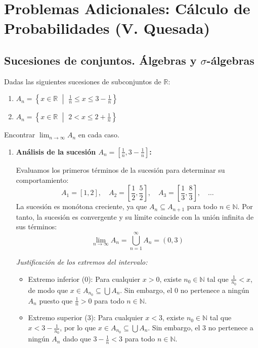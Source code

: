 \chapter{Problemas Adicionales: Cálculo de Probabilidades (V. Quesada)}

\section{Sucesiones de conjuntos. Álgebras y \texorpdfstring{$\sigma$}{sigma}-álgebras}

\begin{problema}
Dadas las siguientes sucesiones de subconjuntos de $\mathbb{R}$:
\begin{enumerate}[label=\alph*)]
    \item $A_n = \left\{ x \in \mathbb{R} \,\,\middle|\,\, \frac{1}{n} \le x \le 3 - \frac{1}{n} \right\}$
    \item $A_n = \left\{ x \in \mathbb{R} \,\,\middle|\,\, 2 < x \le 2 + \frac{1}{n} \right\}$
\end{enumerate}
Encontrar $\displaystyle \lim_{n \to \infty} A_n$ en cada caso.

\tcblower

\begin{enumerate}[label=\alph*)]
    \item \textbf{Análisis de la sucesión $A_n = \left[\frac{1}{n}, 3 - \frac{1}{n}\right]$:}
    
    Evaluamos los primeros términos de la sucesión para determinar su comportamiento:
    \[
        A_1 = [1, 2], \quad A_2 = \left[\frac{1}{2}, \frac{5}{2}\right], \quad A_3 = \left[\frac{1}{3}, \frac{8}{3}\right], \quad \dots
    \]
    La sucesión es monótona creciente, ya que $A_n \subseteq A_{n+1}$ para todo $n \in \mathbb{N}$. Por tanto, la sucesión es convergente y su límite coincide con la unión infinita de sus términos:
    \[
        \lim_{n \to \infty} A_n = \bigcup_{n=1}^\infty A_n = (0, 3)
    \]
    
    \textit{Justificación de los extremos del intervalo:}
    \begin{itemize}
        \item Extremo inferior ($0$): Para cualquier $x > 0$, existe $n_0 \in \mathbb{N}$ tal que $\frac{1}{n_0} < x$, de modo que $x \in A_{n_0} \subseteq \bigcup A_n$. Sin embargo, el $0$ no pertenece a ningún $A_n$ puesto que $\frac{1}{n} > 0$ para todo $n \in \mathbb{N}$.
        \item Extremo superior ($3$): Para cualquier $x < 3$, existe $n_0 \in \mathbb{N}$ tal que $x < 3 - \frac{1}{n_0}$, por lo que $x \in A_{n_0} \subseteq \bigcup A_n$. Sin embargo, el $3$ no pertenece a ningún $A_n$ dado que $3 - \frac{1}{n} < 3$ para todo $n \in \mathbb{N}$.
    \end{itemize}


\end{enumerate}
\end{problema}
